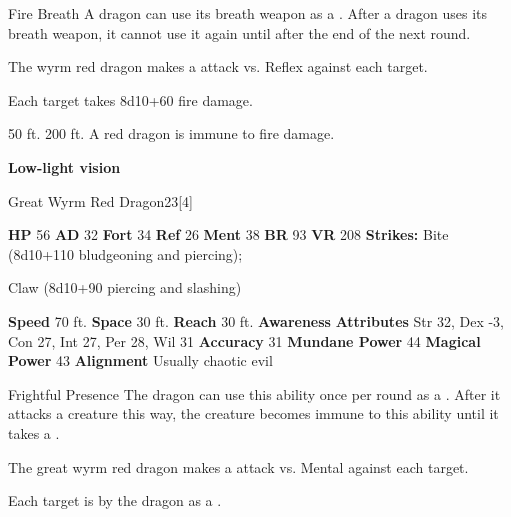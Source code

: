     \begin{freeability}{Fire Breath}
      A dragon can use its breath weapon as a .
      After a dragon uses its breath weapon, it cannot use it again until after the end of the next round.
      \par The wyrm red dragon makes a  attack
        vs. Reflex against each target.
    
    \hit Each target takes 8d10+60 fire damage.
    \end{freeability}
  
      
       50 ft.
     200 ft.
     A red dragon is immune to fire damage.
    \par\noindent\textbf{Low-light vision}
  

  \begin{monsubsection}{Great Wyrm Red Dragon}{23}[4]
    \vspace{-1em}\vspace{-1em}
    \vspace{0em}

    
    

    \begin{spellcontent}
      \begin{spelltargetinginfo}
        \pari \textbf{HP} 56 \monsep
          \textbf{AD} 32 \monsep
          \textbf{Fort} 34 \monsep
          \textbf{Ref} 26 \monsep
          \textbf{Ment} 38
        \pari \textbf{BR} 93 \monsep
        \textbf{VR} 208
        \pari \textbf{Strikes:}
            Bite  (8d10+110 bludgeoning and piercing);
\par Claw  (8d10+90 piercing and slashing)
      \end{spelltargetinginfo}
    \end{spellcontent}
    \begin{monsterfooter}
      \pari \textbf{Speed} 70 ft. \monsep
        \textbf{Space} 30 ft. \monsep
        \textbf{Reach} 30 ft.
      \pari \textbf{Awareness} 
      \pari \textbf{Attributes}
        Str 32, Dex -3,
        Con 27, Int 27,
        Per 28, Wil 31
      \pari \textbf{Accuracy} 31 \monsep
        \textbf{Mundane Power} 44 \monsep
      \textbf{Magical Power} 43
      \pari \textbf{Alignment} Usually chaotic evil
    \end{monsterfooter}
  \end{monsubsection}
  \begin{freeability}{Frightful Presence}
      The dragon can use this ability once per round as a .
      After it attacks a creature this way, the creature becomes immune to this ability until it takes a .
      \par The great wyrm red dragon makes a  attack
        vs. Mental against each target.
    
    \hit Each target is  by the dragon as a .
    \end{freeability}
  


